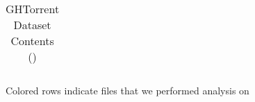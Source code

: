 \begin{table}[htb]
\begin{tabular}{@{}llcl@{}}
        \bottomrule
    \end{tabular}

    \caption{
        GHTorrent Dataset Contents ()
    }
    \small{Colored rows indicate files that we performed analysis on}
\end{table}
